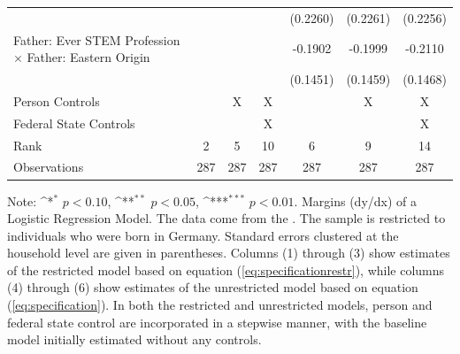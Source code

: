 \documentclass[a4paper, oneside, hyperfootnotes = false]{article}
\def\sym#1{\ifmmode^{#1}\else\(^{#1}\)\fi}
\begin{document}
{\begin{landscape}
\begin{table}[ht]
\begin{center}
{\begin{tabular}{l*{6}{c}}
					&                     &                     &                     &    (0.2260)         &    (0.2261)         &    (0.2256)         \\
					\addlinespace
					Father: Ever STEM Profession $\times$ Father: Eastern Origin&                     &                     &                     &     -0.1902         &     -0.1999         &     -0.2110         \\
					&                     &                     &                     &    (0.1451)         &    (0.1459)         &    (0.1468)         \\
					\midrule
					Person Controls & & X  & X & & X & X \\
					Federal State Controls & & & X & & & X \\
					Rank                &      2         &      5         &     10         &      6         &      9         &     14         \\
					Observations &    287         &    287         &    287         &    287         &    287         &    287         \\
					\bottomrule
			\end{tabular}}
			
			\vspace{2mm}
			
			\parbox{15cm}{
				\linespread{1}\footnotesize Note: \sym{*} \(p<0.10\), \sym{**} \(p<0.05\), \sym{***} \(p<0.01\). Margins (dy/dx) of a Logistic Regression Model. The data come from the \cite{SOEP2023}. The sample is restricted to individuals who were born in Germany. Standard errors clustered at the household level are given in parentheses. Columns (1) through (3) show estimates of the restricted model based on equation (\ref{eq:specificationrestr}), while columns (4) through (6) show estimates of the unrestricted model based on equation (\ref{eq:specification}). In both the restricted and unrestricted models, person and federal state control are incorporated in a stepwise manner, with the baseline model initially estimated without any controls.}
			
		\end{center}
	\end{table}
\end{landscape}

\clearpage

}
\end{document}

